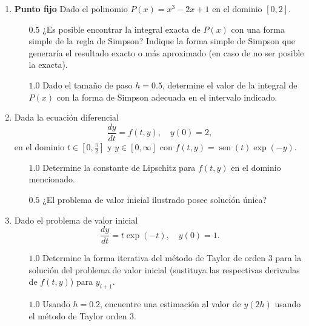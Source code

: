 \documentclass[12pt]{article}
\renewcommand{\sin}{\operatorname{sen}}
\DeclareMathOperator{\sen}{sen}
\renewcommand{\sin}{\sen}
\begin{document}
  \begin{enumerate}[leftmargin=*,widest=9]
    \item \textbf{Punto fijo} Dado el polinomio $P(x) = x^3 - 2x + 1$ en el dominio $[0, 2]$.
    \begin{itemize}
    \item[$0.5$] ¿Es posible encontrar la integral exacta de $P(x)$ con una forma simple de la regla de Simpson? Indique la forma simple de Simpson que generaría el resultado exacto o más aproximado (en caso de no ser posible la exacta).
    
    \vspace{1cm}
    
    \item[$1.0$] Dado el tamaño de paso $h= 0.5$, determine el valor de la integral de $P(x)$ con la forma de Simpson adecuada en el intervalo indicado.
    
    \vspace{4cm}
    
    
    \end{itemize}
    
 \item Dada la ecuación diferencial $$ \frac{dy}{dt} = f(t, y), \quad y(0)= 2,$$ en el dominio $t \in \left[0, \frac{\pi}{2} \right]$ y $y \in [0, \infty]$ con $f(t, y) = \sin(t) \exp(-y)$.
    
    \begin{itemize}
    \item[$1.0$] Determine la constante de Lipschitz para $f(t, y)$ en el dominio mencionado.
    
    \vspace{6cm}
    
    \item[$0.5$] ¿El problema de valor inicial ilustrado posee solución única?
    
    \vspace{.5cm}
    
    \end{itemize}
    
    \item Dado el problema de valor inicial $$ \frac{dy}{dt} = t\exp(-t),\quad y(0)=1. $$
    \begin{itemize}
    \item[$1.0$] Determine la forma iterativa del método de Taylor de orden 3 para la solución del problema de valor inicial (sustituya las respectivas derivadas de $f(t, y)$) para $y_{i+1}$.
    
    \vspace{6cm}
    
    \item[$1.0$] Usando $h=0.2$, encuentre una estimación al valor de $y(2h)$ usando el método de Taylor orden 3.
    
    \end{itemize}
    
  \end{enumerate}

  
\end{document}
